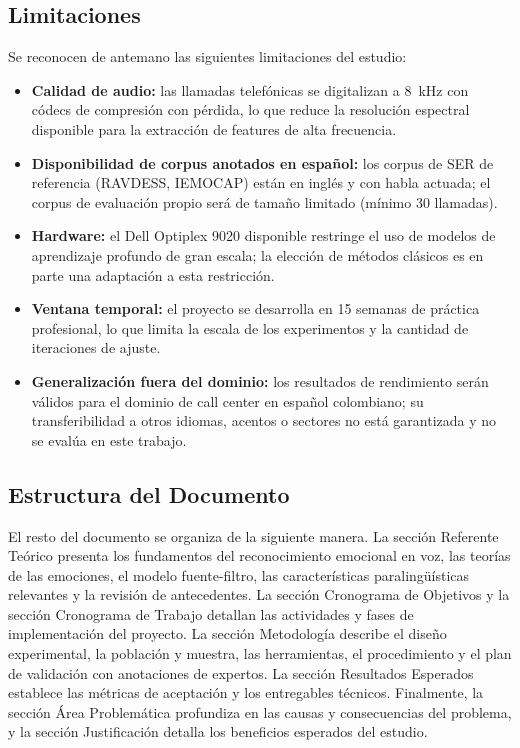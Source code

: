 \subsection{Limitaciones}
\label{sec:intro_limitaciones}

Se reconocen de antemano las siguientes limitaciones del estudio:

\begin{itemize}
    \item \textbf{Calidad de audio:} las llamadas telefónicas se digitalizan a 8~kHz
          con códecs de compresión con pérdida, lo que reduce la resolución espectral
          disponible para la extracción de features de alta frecuencia.
    \item \textbf{Disponibilidad de corpus anotados en español:} los corpus de SER
          de referencia (RAVDESS, IEMOCAP) están en inglés y con habla actuada; el
          corpus de evaluación propio será de tamaño limitado (mínimo 30 llamadas).
    \item \textbf{Hardware:} el Dell Optiplex 9020 disponible restringe el uso de
          modelos de aprendizaje profundo de gran escala; la elección de métodos
          clásicos es en parte una adaptación a esta restricción.
    \item \textbf{Ventana temporal:} el proyecto se desarrolla en 15 semanas de
          práctica profesional, lo que limita la escala de los experimentos y la
          cantidad de iteraciones de ajuste.
    \item \textbf{Generalización fuera del dominio:} los resultados de rendimiento
          serán válidos para el dominio de call center en español colombiano; su
          transferibilidad a otros idiomas, acentos o sectores no está garantizada
          y no se evalúa en este trabajo.
\end{itemize}

\subsection{Estructura del Documento}
\label{sec:intro_estructura}

El resto del documento se organiza de la siguiente manera. La sección Referente
Teórico presenta los fundamentos del reconocimiento emocional en voz, las teorías
de las emociones, el modelo fuente-filtro, las características paralingüísticas
relevantes y la revisión de antecedentes. La sección Cronograma de Objetivos y la
sección Cronograma de Trabajo detallan las actividades y fases de implementación del
proyecto. La sección Metodología describe el diseño experimental, la población y
muestra, las herramientas, el procedimiento y el plan de validación con anotaciones
de expertos. La sección Resultados Esperados establece las métricas de aceptación y
los entregables técnicos. Finalmente, la sección Área Problemática profundiza en las
causas y consecuencias del problema, y la sección Justificación detalla los beneficios
esperados del estudio.
